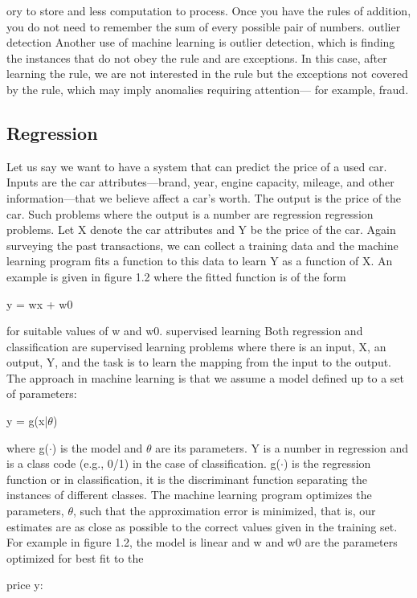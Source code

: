 ory to store and less computation to process. Once you have the rules of addition, you do not need to remember the sum of every possible pair of numbers. outlier detection Another use of machine learning is outlier detection, which is finding the instances that do not obey the rule and are exceptions. In this case, after learning the rule, we are not interested in the rule but the exceptions not covered by the rule, which may imply anomalies requiring attention--- for example, fraud.

\subsection{Regression}

Let us say we want to have a system that can predict the price of a used car. Inputs are the car attributes---brand, year, engine capacity, mileage, and other information---that we believe affect a car’s worth. The output is the price of the car. Such problems where the output is a number are regression regression problems. Let X denote the car attributes and Y be the price of the car. Again surveying the past transactions, we can collect a training data and the machine learning program fits a function to this data to learn Y as a function of X. An example is given in figure 1.2 where the fitted function is of the form

y = wx + w0

for suitable values of w and w0. supervised learning Both regression and classification are supervised learning problems where there is an input, X, an output, Y, and the task is to learn the mapping from the input to the output. The approach in machine learning is that we assume a model defined up to a set of parameters:

y = g(x|$\theta$)

where g($\cdot$) is the model and $\theta$ are its parameters. Y is a number in regression and is a class code (e.g., 0/1) in the case of classification. g($\cdot$) is the regression function or in classification, it is the discriminant function separating the instances of different classes. The machine learning program optimizes the parameters, $\theta$, such that the approximation error is minimized, that is, our estimates are as close as possible to the correct values given in the training set. For example in figure 1.2, the model is linear and w and w0 are the parameters optimized for best fit to the

price y:

